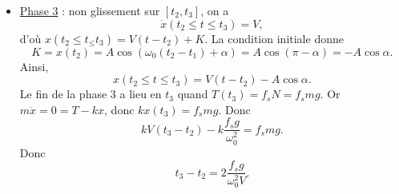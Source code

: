 \begin{itemize}
            \item \underline{Phase 3} : non glissement sur $[t_2,t_3]$, on a 
            \begin{equation*}
                \dot{x}(t_2\leqslant t\leqslant t_3)=V,
            \end{equation*}
            d'où $x(t_2\leqslant t_\leqslant t_3)=V(t-t_2)+K$. La condition initiale donne
            \begin{equation*}
                K=x(t_2)=A\cos\left(\omega_0(t_2-t_1)+\alpha\right)=A\cos\left(\pi-\alpha\right)=-A\cos\alpha.
            \end{equation*}
            Ainsi,
            \begin{equation*}
                x(t_2\leqslant t\leqslant t_3)=V(t-t_2)-A\cos\alpha.
            \end{equation*}
            Le fin de la phase 3 a lieu en $t_3$ quand $T(t_3)=f_s N=f_s mg$. Or $m\ddot{x}=0=T-kx$, donc $kx(t_3)=f_s mg$. Donc
            \begin{equation*}
                kV(t_3-t_2)-k\frac{f_s g}{\omega_0^{2}}=f_s mg.
            \end{equation*}
            Donc 
            \begin{equation*}
                t_3-t_2=2\frac{f_s g}{\omega_0^{2}V}.
            \end{equation*}
        \end{itemize}





